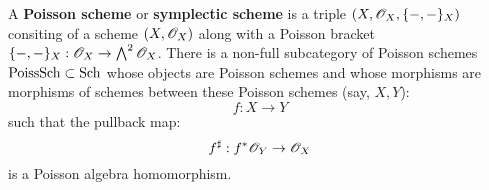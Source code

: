             \begin{definition} \label{def: poisson_schemes}
                A \textbf{Poisson scheme} or \textbf{symplectic scheme} is a triple $(X, \mathscr{O}_X, \{-, -\}_X)$ consiting of a scheme $(X, \mathscr{O}_X)$ along with a Poisson bracket $\{-, -\}_X: \mathscr{O}_X \to \bigwedge^2 \mathscr{O}_X$. There is a non-full subcategory of Poisson schemes $\mathrm{Poiss}\mathrm{Sch} \subset \mathrm{Sch}$ whose objects are Poisson schemes and whose morphisms are morphisms of schemes between these Poisson schemes (say, $X, Y$):
                    $$f: X \to Y$$
                such that the pullback map:
                    $$f^{\sharp}: f^*\mathscr{O}_Y \to \mathscr{O}_X$$
                is a Poisson algebra homomorphism.
            \end{definition}
            \begin{definition}
                
            \end{definition}
    
    \printbibliography

